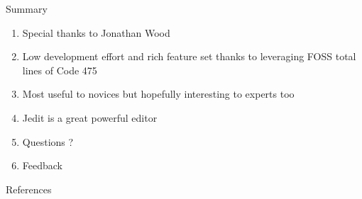 \documentclass{beamer}
\begin{document}
\begin{frame}{Summary}
\begin{enumerate}
\item Special thanks to Jonathan Wood
\item Low development effort and rich feature set thanks to leveraging FOSS total lines of Code 475
\item Most useful to novices but hopefully interesting to experts too
\item Jedit is a great powerful editor
\item Questions ?
\item Feedback
\end{enumerate}
\end{frame}

\begin{frame}[allowframebreaks]{References}


\end{frame}
\end{document}
